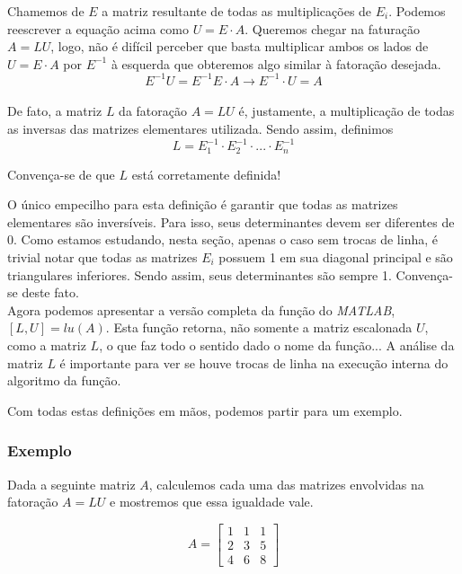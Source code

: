 \documentclass[12pt]{article}
\begin{document}
	Chamemos de $E$ a matriz resultante de todas as multiplicações de $E_i$. Podemos reescrever a equação acima como $U=E\cdot A$. Queremos chegar na faturação $A=LU$, logo, não é difícil perceber que basta multiplicar ambos os lados de $U=E\cdot A$ por $E^{-1}$ à esquerda que obteremos algo similar à fatoração desejada.
	\begin{equation*}
		E^{-1}U=E^{-1}E\cdot A \rightarrow E^{-1}\cdot U=A
	\end{equation*}\\
	
	De fato, a matriz $L$ da fatoração $A=LU$ é, justamente, a multiplicação de todas as inversas das matrizes elementares utilizada. Sendo assim, definimos
	\begin{equation*}
		L=E_1^{-1}\cdot E_2^{-1}\cdot ... \cdot E_n^{-1}
	\end{equation*}
	
	Convença-se de que $L$ está corretamente definida!
	
	O único empecilho para esta definição é garantir que todas as matrizes elementares são inversíveis. Para isso, seus determinantes devem ser diferentes de 0. Como estamos estudando, nesta seção, apenas o caso sem trocas de linha, é trivial notar que todas as matrizes $E_i$ possuem 1 em sua diagonal principal e são triangulares inferiores. Sendo assim, seus determinantes são sempre 1. Convença-se deste fato.\\
	
	Agora podemos apresentar a versão completa da função do \textit{MATLAB}, $[L,U]=lu(A)$. Esta função retorna, não somente a matriz escalonada $U$, como a matriz $L$, o que faz todo o sentido dado o nome da função... A análise da matriz $L$ é importante para ver se houve trocas de linha na execução interna do algoritmo da função.
	
	Com todas estas definições em mãos, podemos partir para um exemplo.
	\subsubsection{Exemplo}
	Dada a seguinte matriz $A$, calculemos cada uma das matrizes envolvidas na fatoração $A=LU$ e mostremos que essa igualdade vale.
	
	\begin{equation*}
		A=\begin{bmatrix}
			1 & 1 & 1\\
			2 & 3 & 5\\
			4 & 6 & 8
		\end{bmatrix} 
	\end{equation*}\\
	
\end{document}
